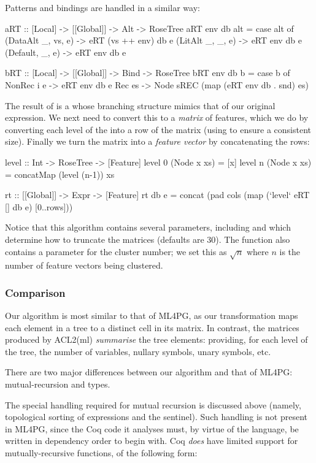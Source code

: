 Patterns and bindings are handled in a similar way:

\begin{haskell}
aRT :: [Local] -> [[Global]] -> Alt -> RoseTree
aRT env db alt = case alt of
  (DataAlt _, vs, e) -> eRT (vs ++ env) db e
  (LitAlt  _, _,  e) -> eRT env db e
  (Default,   _,  e) -> eRT env db e

bRT :: [Local] -> [[Global]] -> Bind -> RoseTree
bRT env db b = case b of
  NonRec i e -> eRT env db e
  Rec es     -> Node sREC (map (eRT env db . snd) es)
\end{haskell}

The result of  is a  whose branching structure mimics that of our original expression. We next need to convert this to a \emph{matrix} of features, which we do by converting each level of the  into a row of the matrix (using  to ensure a consistent size). Finally we turn the matrix into a \emph{feature vector} by concatenating the rows:

\begin{haskell}
level :: Int -> RoseTree -> [Feature]
level 0 (Node x xs) = [x]
level n (Node x xs) = concatMap (level (n-1)) xs

rt :: [[Global]] -> Expr -> [Feature]
rt db e = concat (pad cols (map (`level` eRT [] db e) [0..rows]))
\end{haskell}

Notice that this algorithm contains several parameters, including  and  which determine how to truncate the matrices (defaults are 30). The  function also contains a parameter for the cluster number; we set this as $\sqrt{n}$ where $n$ is the number of feature vectors being clustered.

\subsubsection{Comparison}

Our algorithm is most similar to that of ML4PG, as our transformation maps each element in a tree to a distinct cell in its matrix. In contrast, the matrices produced by ACL2(ml) \emph{summarise} the tree elements: providing, for each level of the tree, the number of variables, nullary symbols, unary symbols, etc.

There are two major differences between our algorithm and that of ML4PG: mutual-recursion and types.

The special handling required for mutual recursion is discussed above (namely, topological sorting of expressions and the  sentinel). Such handling is not present in ML4PG, since the Coq code it analyses must, by virtue of the language, be written in dependency order to begin with. Coq \emph{does} have limited support for mutually-recursive functions, of the following form:


